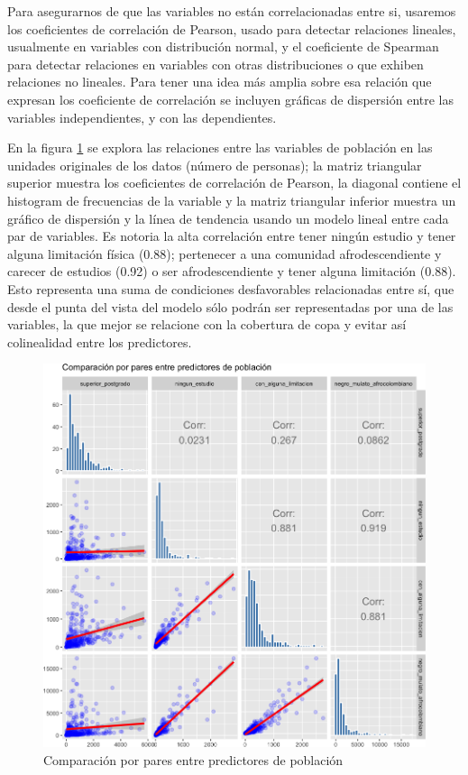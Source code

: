 \documentclass[12pt,]{book}
\begin{document}
Para asegurarnos de que las variables no están correlacionadas entre si,
usaremos los coeficientes de correlación de Pearson, usado para detectar
relaciones lineales, usualmente en variables con distribución normal, y
el coeficiente de Spearman para detectar relaciones en variables con
otras distribuciones o que exhiben relaciones no lineales. Para tener
una idea más amplia sobre esa relación que expresan los coeficiente de
correlación se incluyen gráficas de dispersión entre las variables
independientes, y con las dependientes.

En la figura \ref{fig:bivar-poblacion-abs} se explora las relaciones
entre las variables de población en las unidades originales de los datos
(número de personas); la matriz triangular superior muestra los
coeficientes de correlación de Pearson, la diagonal contiene el
histogram de frecuencias de la variable y la matriz triangular inferior
muestra un gráfico de dispersión y la línea de tendencia usando un
modelo lineal entre cada par de variables. Es notoria la alta
correlación entre tener ningún estudio y tener alguna limitación física
(0.88); pertenecer a una comunidad afrodescendiente y carecer de
estudios (0.92) o ser afrodescendiente y tener alguna limitación (0.88).
Esto representa una suma de condiciones desfavorables relacionadas entre
sí, que desde el punta del vista del modelo sólo podrán ser
representadas por una de las variables, la que mejor se relacione con la
cobertura de copa y evitar así colinealidad entre los predictores.

\begin{figure}
\includegraphics[width=1\linewidth]{tesis-unigis_files/figure-latex/bivar-poblacion-abs-1} \caption{Comparación por pares entre predictores de población}\label{fig:bivar-poblacion-abs}
\end{figure}
\end{document}
